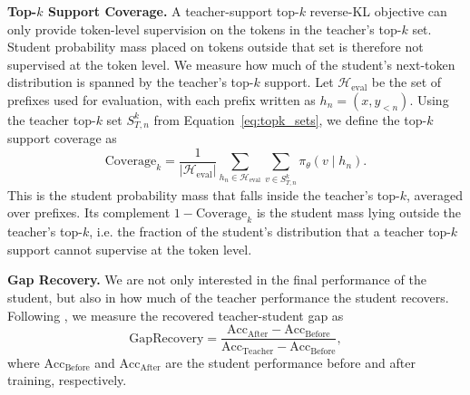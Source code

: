 \textbf{Top-$k$ Support Coverage.}
A teacher-support top-$k$ reverse-KL objective can only provide token-level supervision on the tokens in the teacher's top-$k$ set. Student probability mass placed on tokens outside that set is therefore not supervised at the token level. We measure how much of the student's next-token distribution is spanned by the teacher's top-$k$ support. Let $\mathcal{H}_{\mathrm{eval}}$ be the set of prefixes used for evaluation, with each prefix written as $h_n=(x,y_{<n})$. Using the teacher top-$k$ set $S_{T,n}^{k}$ from Equation~\ref{eq:topk_sets}, we define the top-$k$ support coverage as
\begin{equation}
\mathrm{Coverage}_{k}
=
\frac{1}{|\mathcal{H}_{\mathrm{eval}}|}
\sum_{h_n \in \mathcal{H}_{\mathrm{eval}}}
\sum_{v \in S_{T,n}^{k}}
\pi_\theta(v \mid h_n).
\label{eq:topk_support_coverage}
\end{equation}
This is the student probability mass that falls inside the teacher's top-$k$, averaged over prefixes. Its complement $1-\mathrm{Coverage}_{k}$ is the student mass lying outside the teacher's top-$k$, i.e. the fraction of the student's distribution that a teacher top-$k$ support cannot supervise at the token level.

\noindent\textbf{Gap Recovery.}
We are not only interested in the final performance of the student, but also in how much of the teacher performance the student recovers. Following \cite{liRethinkingOnPolicyDistillation2026}, we measure the recovered teacher-student gap as
\begin{equation}
\mathrm{GapRecovery}
=
\frac{\mathrm{Acc}_{\mathrm{After}}-\mathrm{Acc}_{\mathrm{Before}}}
{\mathrm{Acc}_{\mathrm{Teacher}}-\mathrm{Acc}_{\mathrm{Before}}},
\end{equation}
where $\mathrm{Acc}_{\mathrm{Before}}$ and $\mathrm{Acc}_{\mathrm{After}}$ are the student performance before and after training, respectively.
